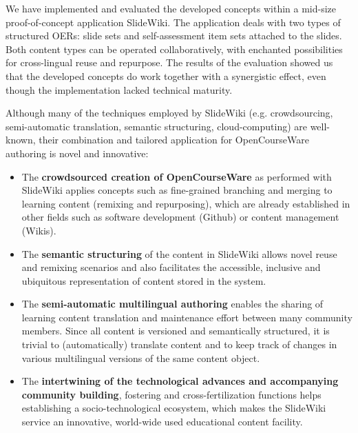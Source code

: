 \documentclass[ngerman,UKenglish,table]{scrbook}
\begin{document}
We have implemented and evaluated the developed concepts within a mid-size proof-of-concept application SlideWiki.
The application deals with two types of structured OERs: slide sets and self-assessment item sets attached to the slides.
Both content types can be operated collaboratively, with enchanted possibilities for cross-lingual reuse and repurpose.  
The results of the evaluation showed us that the developed concepts do work together with a synergistic effect, even though the implementation lacked technical maturity.

Although many of the techniques employed by SlideWiki (e.g. crowdsourcing, semi-automatic translation, semantic structuring, cloud-computing) are well-known, their combination and tailored application for OpenCourseWare authoring is novel and innovative:
\begin{itemize}
\item The \textbf{crowdsourced creation of OpenCourseWare} as performed with SlideWiki applies concepts such as fine-grained branching and merging to learning content (remixing and repurposing), which are already established in other fields such as software development (Github) or content management (Wikis).
\item The \textbf{semantic structuring} of the content in SlideWiki allows novel reuse and remixing scenarios and also facilitates the accessible, inclusive and ubiquitous representation of content stored in the system.
\item The \textbf{semi-automatic multilingual authoring} enables the sharing of learning content translation and maintenance effort between many community members. Since all content is versioned and semantically structured, it is trivial to (automatically) translate content and to keep track of changes in various multilingual versions of the same content object.
\item The \textbf{intertwining of the technological advances and accompanying community building}, fostering and cross-fertilization functions helps establishing a socio-technological ecosystem, which makes the SlideWiki service an innovative, world-wide used educational content facility.
\end{itemize}
\end{document}
